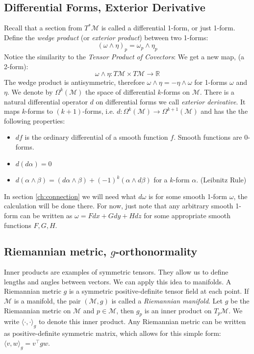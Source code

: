 \documentclass[../thesis.tex]{subfiles}
\begin{document}
\subsection{Differential Forms, Exterior Derivative}
Recall that a section from $T^*\mathcal{M}$ is called a differential 1-form, or just 1-form.
Define the \emph{wedge product} (or \emph{exterior product}) between two 1-forms:
$$(\omega \wedge \eta)_p = \omega_p \wedge \eta_p$$
Notice the similarity to the \emph{Tensor Product of Covectors}: We get a new map, (a 2-form):
$$\omega \wedge \eta: T\mathcal{M} \times T\mathcal{M} \to \mathbb{R}$$
The wedge product is antisymmetric, therefore $\omega \wedge \eta = -\eta \wedge \omega$ for 1-forms $\omega$ and $\eta$.
We denote by $\Omega^k(\mathcal{M})$ the space of differential $k$-forms on $\mathcal{M}$.
There is a natural differential operator $d$ on differential forms we call \emph{exterior derivative}.
It maps $k$-forms to $(k+1)$-forms, i.e. $d: \Omega^k(\mathcal{M}) \to \Omega^{k+1}(\mathcal{M})$
and has the the following properties:
\begin{itemize}
  \item $df$ is the ordinary differential of a smooth function $f$. Smooth functions are 0-forms.
  \item $d(d\alpha) = 0$
  \item $d(\alpha \wedge \beta) = (d\alpha \wedge \beta) + (-1)^k(\alpha \wedge d\beta)$ for a $k$-form $\alpha$. (Leibnitz Rule)
\end{itemize}
In section \ref{ch:connection} we will need what $d\omega$ is for some smooth 1-form $\omega$, the calculation
will be done there. For now, just note that 
any arbitrary smooth 1-form can be written as $\omega = Fdx+Gdy+Hdz$ for some appropriate smooth functions $F,G,H$.


\subsection{Riemannian metric, $g$-orthonormality}
Inner products are examples of symmetric tensors. They allow us to define lengths and angles
between vectors. We can apply this idea to manifolds.
A Riemannian metric $g$ is a symmetric positive-definite tensor field at each point.
If $\mathcal{M}$ is a manifold, the pair $(\mathcal{M},g)$ is called a \emph{Riemannian manifold}.
Let $g$ be the Riemannian metric on $\mathcal{M}$ and $p\in \mathcal{M}$,
then $g_p$ is an inner product on $T_p\mathcal{M}$. We write $\langle \cdot, \cdot\rangle_g$ to denote this inner product.
Any Riemannian metric can be written as positive-definite symmetric matrix, which allows for this simple form: $\langle v,w\rangle_g = v^{\top}gw$.
\end{document}
